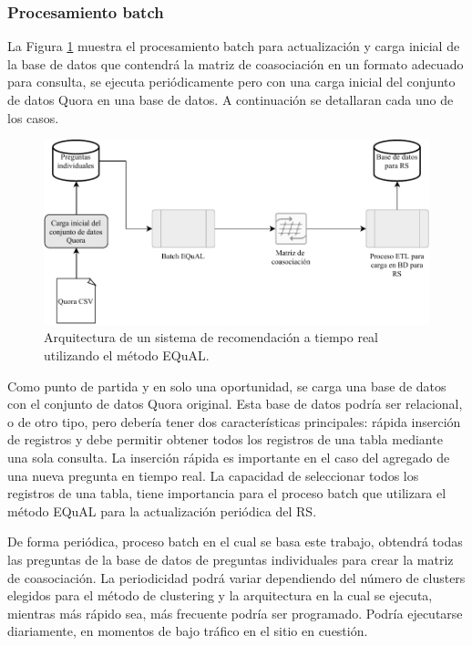 \subsubsection{Procesamiento batch}
La Figura \ref{fig:implementacionrsbatch} muestra el procesamiento batch para actualización y carga inicial de la base de datos que contendrá la matriz de coasociación en un formato adecuado para consulta, se ejecuta periódicamente pero con una carga inicial del conjunto de datos Quora en una base de datos. A continuación se detallaran cada uno de los casos.

\bigskip
\begin{figure}[h!]
	\centering
	\includegraphics[width=0.9\linewidth]{8_problema_investigacion/imagenes/implementacion_rs_batch}
	\caption{Arquitectura de un sistema de recomendación a tiempo real utilizando el método EQuAL.}
	\label{fig:implementacionrsbatch}
\end{figure}

Como punto de partida y en solo una oportunidad, se carga una base de datos con el conjunto de datos Quora original. Esta base de datos podría ser relacional, o de otro tipo, pero debería tener dos características principales: rápida inserción de registros y debe permitir obtener todos los registros de una tabla mediante una sola consulta. La inserción rápida es importante en el caso del agregado de una nueva pregunta en tiempo real. La capacidad de seleccionar todos los registros de una tabla, tiene importancia para el proceso batch que utilizara el método EQuAL para la actualización periódica del RS.

\bigskip De forma periódica, proceso batch en el cual se basa este trabajo, obtendrá todas las preguntas de la base de datos de preguntas individuales para crear la matriz de coasociación. La periodicidad podrá variar dependiendo del número de clusters elegidos para el método de clustering y la arquitectura en la cual se ejecuta, mientras más rápido sea, más frecuente podría ser programado. Podría ejecutarse diariamente, en momentos de bajo tráfico en el sitio en cuestión.

